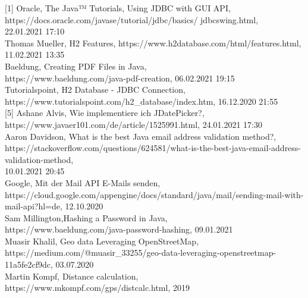 \documentclass[a4paper, 12pt]{report}
\begin{document}
[1] Oracle, The Java™ Tutorials, Using JDBC with GUI API,\\
https://docs.oracle.com/javase/tutorial/jdbc/basics/		jdbcswing.html, \\22.01.2021 17:10 \\\relax
[2] Thomas Mueller, H2 Features, https://www.h2database.com/html/features.html,\\ 11.02.2021 13:35 \\\relax
[3] Baeldung, Creating PDF Files in Java, \\https://www.baeldung.com/java-pdf-creation, 06.02.2021 19:15 \\\relax
[4] Tutorialspoint, H2 Database - JDBC Connection, \\https://www.tutorialspoint.com/h2_database/index.htm, 16.12.2020 21:55 \\\relax
[5] Ashane Alvis, Wie implementiere ich JDatePicker?, \\https://www.javaer101.com/de/article/1525991.html, 24.01.2021 17:30 \\\relax
[6] Aaron Davidson, What is the best Java email address validation method?, \\https://stackoverflow.com/questions/624581/what-is-the-best-java-email-address-validation-method, \\10.01.2021 20:45 \\\relax
[7]Google, Mit der Mail API E-Mails senden, \\https://cloud.google.com/appengine/docs/standard/java/mail/sending-mail-with-mail-api?hl=de, 12.10.2020\\\relax
[8]Sam Millington,Hashing a Password in Java,\\https://www.baeldung.com/java-password-hashing, 09.01.2021 \\\relax
[9]Muasir Khalil, Geo data Leveraging OpenStreetMap,\\https://medium.com/@muasir_33255/geo-data-leveraging-openstreetmap-11a5fe2cf9dc, 03.07.2020\\\relax
[10]Martin Kompf, Distance calculation,\\https://www.mkompf.com/gps/distcalc.html, 2019
\end{document}
